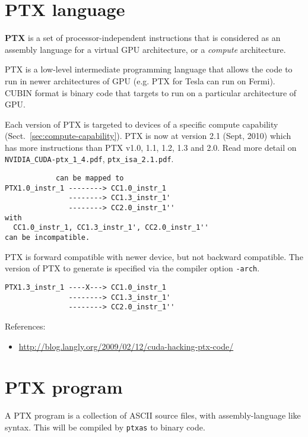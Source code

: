 \section{PTX language}
\label{sec:ptx-language}

{\bf PTX} is a set of processor-independent instructions that is
considered as an assembly language for a virtual GPU architecture, or
a {\it compute} architecture. 

PTX is a low-level intermediate programming language that allows the code to run
in newer architectures of GPU (e.g. PTX for Tesla can run on Fermi). CUBIN
format is binary code that targets to run on a particular architecture of GPU.


Each version of PTX is targeted to devices of a specific compute
capability (Sect.~\ref{sec:compute-capability}). PTX is now at
version 2.1 (Sept, 2010) which has more instructions than PTX v1.0,
1.1, 1.2, 1.3 and 2.0. Read more detail on
\verb!NVIDIA_CUDA-ptx_1_4.pdf!, \verb!ptx_isa_2.1.pdf!.

\begin{verbatim}
            can be mapped to
PTX1.0_instr_1 --------> CC1.0_instr_1
               --------> CC1.3_instr_1'
               --------> CC2.0_instr_1''
with
  CC1.0_instr_1, CC1.3_instr_1', CC2.0_instr_1'' 
can be incompatible.
\end{verbatim}

PTX is forward compatible with newer device, but not backward
compatible. The version of PTX to generate is specified via the
compiler option \verb!-arch!.
\begin{verbatim}
PTX1.3_instr_1 ----X---> CC1.0_instr_1
               --------> CC1.3_instr_1'
               --------> CC2.0_instr_1''
\end{verbatim}



References:
\begin{itemize}
\item \url{http://blog.langly.org/2009/02/12/cuda-hacking-ptx-code/}
\end{itemize}

\section{PTX program}
\label{sec:ptx-program}


A PTX program is a collection of ASCII source files, with
assembly-language like syntax. This will be compiled by \verb!ptxas!
to binary code.

